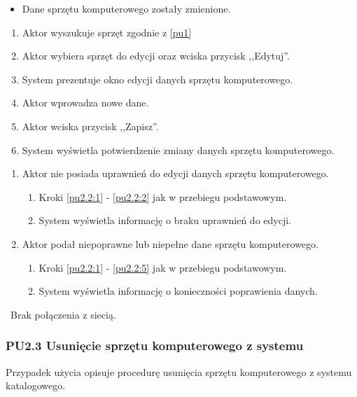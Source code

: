 \begin{itemize}
\item Dane sprzętu komputerowego zostały zmienione.
\end{itemize}

\begin{enumerate}
\item \label{pu2.2:1} Aktor wyszukuje sprzęt zgodnie z \ref{pu1}
\item \label{pu2.2:2} Aktor wybiera sprzęt do edycji oraz wciska przycisk ,,Edytuj''.
\item System prezentuje okno edycji danych sprzętu komputerowego.
\item Aktor wprowadza nowe dane.
\item \label{pu2.2:5} Aktor wciska przycisk ,,Zapisz''.
\item System wyświetla potwierdzenie zmiany danych sprzętu komputerowego.
\end{enumerate}

\begin{enumerate}
\item Aktor nie posiada uprawnień do edycji danych sprzętu komputerowego.
	\begin{enumerate}[label*=\arabic*.]
		\item Kroki \ref{pu2.2:1} - \ref{pu2.2:2} jak w przebiegu podstawowym.
		\item System wyświetla informację o braku uprawnień do edycji.
	\end{enumerate}
\item Aktor podał niepoprawne lub niepełne dane sprzętu komputerowego.
	\begin{enumerate}[label*=\arabic*.]
		\item Kroki \ref{pu2.2:1} - \ref{pu2.2:5} jak w przebiegu podstawowym.
		\item System wyświetla informację o konieczności poprawienia danych.
	\end{enumerate}
\end{enumerate}

\
Brak połączenia z siecią.

\subsubsection{PU2.3 Usunięcie sprzętu komputerowego z systemu}

Przypadek użycia opisuje procedurę usunięcia sprzętu komputerowego z systemu katalogowego.


